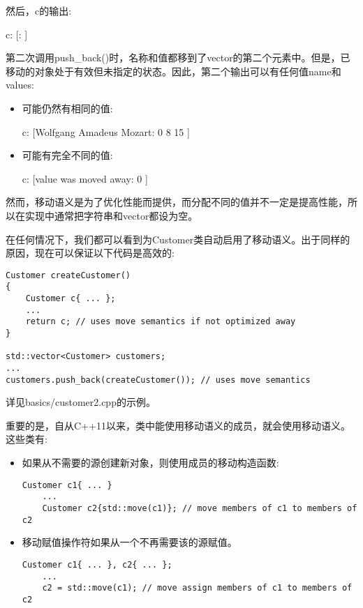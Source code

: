 然后，c的输出:\par

\begin{tcolorbox}[colback=white,colframe=black]
c: [: ]
\end{tcolorbox}

第二次调用push\_back()时，名称和值都移到了vector的第二个元素中。但是，已移动的对象处于有效但未指定的状态。因此，第二个输出可以有任何值name和values:\par

\begin{itemize}
	\item 可能仍然有相同的值:\par
	\begin{tcolorbox}[colback=white,colframe=black]
	c: [Wolfgang Amadeus Mozart: 0 8 15 ]
	\end{tcolorbox}
	\item 可能有完全不同的值:\par
	\begin{tcolorbox}[colback=white,colframe=black]
	c: [value was moved away: 0 ]
	\end{tcolorbox}
\end{itemize}

然而，移动语义是为了优化性能而提供，而分配不同的值并不一定是提高性能，所以在实现中通常把字符串和vector都设为空。\par

在任何情况下，我们都可以看到为Customer类自动启用了移动语义。出于同样的原因，现在可以保证以下代码是高效的:\par

\begin{lstlisting}[caption={}]
Customer createCustomer()
{
	Customer c{ ... };
	...
	return c; // uses move semantics if not optimized away
}

std::vector<Customer> customers;
...
customers.push_back(createCustomer()); // uses move semantics
\end{lstlisting}

详见basics/customer2.cpp的示例。\par

重要的是，自从C++11以来，类中能使用移动语义的成员，就会使用移动语义。这些类有:\par

\begin{itemize}
	\item 如果从不需要的源创建新对象，则使用成员的移动构造函数:\par
	\begin{lstlisting}[caption={}]
	Customer c1{ ... }
	...
	Customer c2{std::move(c1)}; // move members of c1 to members of c2
	\end{lstlisting}
	\item 移动赋值操作符如果从一个不再需要该的源赋值。\par
	\begin{lstlisting}[caption={}]
	Customer c1{ ... }, c2{ ... };
	...
	c2 = std::move(c1); // move assign members of c1 to members of c2
	\end{lstlisting}
\end{itemize}

